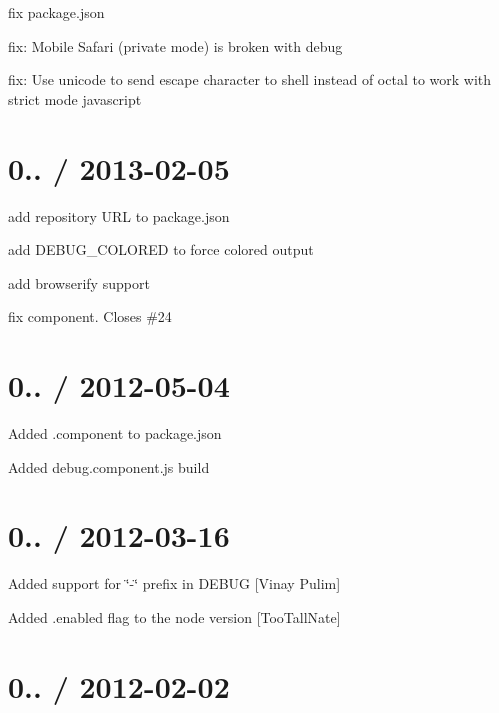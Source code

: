 \begin{DoxyItemize}
\item fix package.\+json
\item fix\+: Mobile Safari (private mode) is broken with debug
\item fix\+: Use unicode to send escape character to shell instead of octal to work with strict mode javascript
\end{DoxyItemize}

\section*{0.. / 2013-\/02-\/05 }


\begin{DoxyItemize}
\item add repository U\+RL to package.\+json
\item add D\+E\+B\+U\+G\+\_\+\+C\+O\+L\+O\+R\+ED to force colored output
\item add browserify support
\item fix component. Closes \#24
\end{DoxyItemize}

\section*{0.. / 2012-\/05-\/04 }


\begin{DoxyItemize}
\item Added .component to package.\+json
\item Added debug.\+component.\+js build
\end{DoxyItemize}

\section*{0.. / 2012-\/03-\/16 }


\begin{DoxyItemize}
\item Added support for \char`\"{}-\/\char`\"{} prefix in D\+E\+B\+UG \mbox{[}Vinay Pulim\mbox{]}
\item Added {\ttfamily .enabled} flag to the node version \mbox{[}Too\+Tall\+Nate\mbox{]}
\end{DoxyItemize}

\section*{0.. / 2012-\/02-\/02 }


